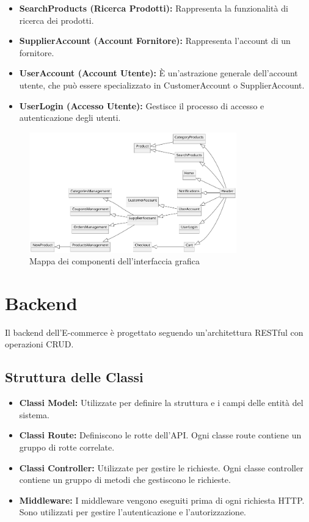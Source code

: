 \begin{itemize}
    \item \textbf{SearchProducts (Ricerca Prodotti):} Rappresenta la funzionalità di ricerca dei prodotti.
    \item \textbf{SupplierAccount (Account Fornitore):} Rappresenta l'account di un fornitore.
    \item \textbf{UserAccount (Account Utente):} È un'astrazione generale dell'account utente, che può essere specializzato in CustomerAccount o SupplierAccount.
    \item \textbf{UserLogin (Accesso Utente):} Gestisce il processo di accesso e autenticazione degli utenti.
\end{itemize}

\begin{figure}[H]
    \centering
    \includegraphics[width=0.8\textwidth]{figures/site-map.png}
    \caption{Mappa dei componenti dell'interfaccia grafica}
    \label{fig:site-map}
\end{figure}

\section{Backend}
Il backend dell'E-commerce è progettato seguendo un'architettura RESTful con operazioni CRUD.

\subsection{Struttura delle Classi}
\begin{itemize}
    \item \textbf{Classi Model:} Utilizzate per definire la struttura e i campi delle entità del sistema.
    \item \textbf{Classi Route:} Definiscono le rotte dell'API. Ogni classe route contiene un gruppo di rotte correlate.
    \item \textbf{Classi Controller:} Utilizzate per gestire le richieste. Ogni classe controller contiene un gruppo di metodi che gestiscono le richieste.
    \item \textbf{Middleware:} I middleware vengono eseguiti prima di ogni richiesta HTTP. Sono utilizzati per gestire l'autenticazione e l'autorizzazione.
\end{itemize}

